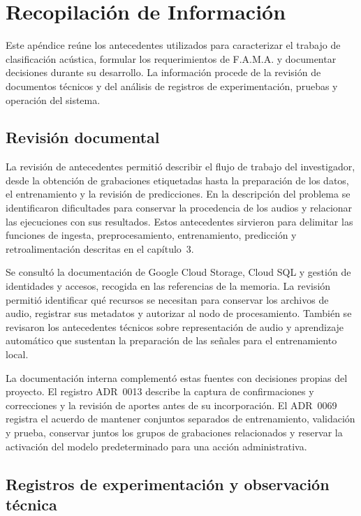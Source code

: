 \chapter{Recopilación de Información}
\label{ap:recopilacion-informacion}

Este apéndice reúne los antecedentes utilizados para caracterizar el trabajo de
clasificación acústica, formular los requerimientos de F.A.M.A. y documentar
decisiones durante su desarrollo. La información procede de la revisión de
documentos técnicos y del análisis de registros de experimentación, pruebas y
operación del sistema.

\section{Revisión documental}

La revisión de antecedentes permitió describir el flujo de trabajo del
investigador, desde la obtención de grabaciones etiquetadas hasta la
preparación de los datos, el entrenamiento y la revisión de predicciones.
En la descripción del problema se identificaron dificultades para conservar
la procedencia de los audios y relacionar las ejecuciones con sus resultados.
Estos antecedentes sirvieron para delimitar las funciones de ingesta,
preprocesamiento, entrenamiento, predicción y retroalimentación descritas en
el capítulo~3.

Se consultó la documentación de Google Cloud Storage, Cloud SQL y gestión de
identidades y accesos, recogida en las referencias de la memoria. La revisión
permitió identificar qué recursos se necesitan para conservar los archivos
de audio, registrar sus metadatos y autorizar al nodo de procesamiento.
También se revisaron los antecedentes técnicos sobre representación de audio
y aprendizaje automático que sustentan la preparación de las señales para
el entrenamiento local.

La documentación interna complementó estas fuentes con decisiones propias
del proyecto. El registro ADR~0013 describe la captura de confirmaciones y
correcciones y la revisión de aportes antes de su incorporación. El
ADR~0069 registra el acuerdo de mantener conjuntos separados de
entrenamiento, validación y prueba, conservar juntos los grupos de
grabaciones relacionados y reservar la activación del modelo predeterminado
para una acción administrativa.

\section{Registros de experimentación y observación técnica}

